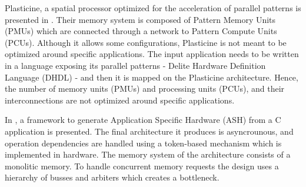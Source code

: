 Plasticine, a spatial processor optimized for the acceleration of parallel patterns is presented in \cite{prabhakar2017plasticine}. Their memory system is composed of Pattern Memory Units (PMUs) which are connected through a network to Pattern Compute Units (PCUs). Although it allows some configurations, Plasticine is not meant to be optimized around specific applications. The input application needs to be written in a language exposing its parallel patterns - Delite Hardware Definition Language (DHDL) - and then it is mapped on the Plasticine architecture. Hence, the number of memory units (PMUs) and processing units (PCUs), and their interconnections are not optimized around specific applications.

In \cite{budiu2004spatial}, a framework to generate Application Specific Hardware (ASH) from a C application is presented. The final architecture it produces is asyncrounous, and operation dependencies are handled using a token-based mechanism which is implemented in hardware. The memory system of the architecture consists of a monolitic memory. To handle concurrent memory requests the design uses a hierarchy of busses and arbiters which creates a bottleneck.
